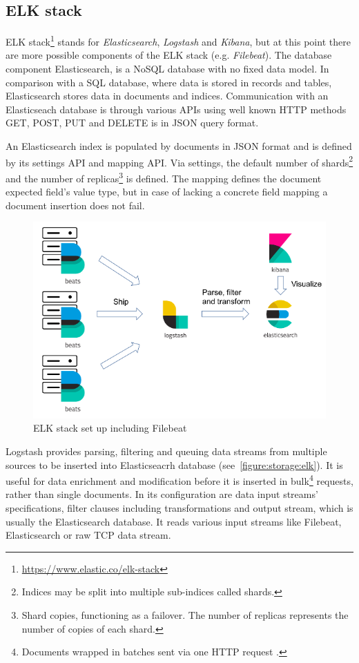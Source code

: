 \documentclass[12pt,a4paper,twoside]{report}
\begin{document}
		\subsection{ELK stack} \label{analysis:storage:elastic}
			ELK stack\footnote{\url{https://www.elastic.co/elk-stack}} stands for \emph{Elasticsearch}, \emph{Logstash} and \emph{Kibana}, but at this point there are more possible components of the ELK stack (e.g. \emph{Filebeat}). The database component Elasticsearch, is a NoSQL database with no fixed data model. In comparison with a SQL database, where data is stored in records and tables, Elasticsearch stores data in documents and indices. Communication with an Elasticseach database is through various APIs using well known HTTP methods GET, POST, PUT and DELETE is in JSON query format.\par
			An Elasticsearch index is populated by documents in JSON format and is defined by its settings API and mapping API. Via settings, the default number of shards\footnote{Indices may be split into multiple sub-indices called shards.} and the number of replicas\footnote{Shard copies, functioning as a failover. The number of replicas represents the number of copies of each shard.} \cite{docs:elastic:terms} is defined. The mapping defines the document expected field's value type, but in case of lacking a concrete field mapping a document insertion does not fail.\par
			\begin{figure}
				\centering
				\includegraphics[scale=0.5]{logstash-filebeat}
				\caption{ELK stack set up including Filebeat}
				\label{figure:storage:elk}
			\end{figure}
			Logstash provides parsing, filtering and queuing data streams from multiple sources to be inserted into Elasticseacrh database (see~\autoref{figure:storage:elk}). It is useful for data enrichment and modification before it is inserted in bulk\footnote{Documents wrapped in batches sent via one HTTP request \cite{docs:elastic:bulk}.} requests, rather than single documents. In its configuration are data input streams' specifications, filter clauses including transformations and output stream, which is usually the Elasticsearch database. It reads various input streams like Filebeat, Elasticsearch or raw TCP data stream.\par
\end{document}
